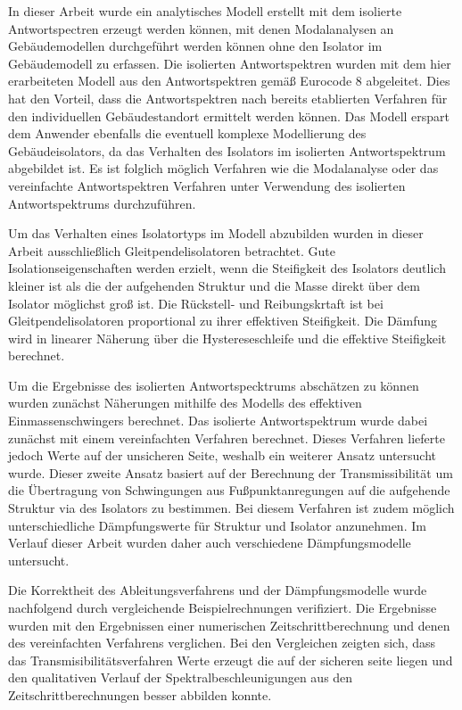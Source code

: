 
In dieser Arbeit wurde ein analytisches Modell erstellt mit dem isolierte Antwortspectren erzeugt werden können, mit denen Modalanalysen an Gebäudemodellen durchgeführt werden können ohne den Isolator im Gebäudemodell zu erfassen.
Die isolierten Antwortspektren wurden mit dem hier erarbeiteten Modell aus den Antwortspektren gemäß Eurocode 8 abgeleitet.
Dies hat den Vorteil, dass die Antwortspektren nach bereits etablierten Verfahren für den individuellen Gebäudestandort ermittelt werden können.
Das Modell erspart dem Anwender ebenfalls die eventuell komplexe Modellierung des Gebäudeisolators, da das Verhalten des Isolators im isolierten Antwortspektrum abgebildet ist.
Es ist folglich möglich Verfahren wie die Modalanalyse oder das vereinfachte Antwortspektren Verfahren unter Verwendung des isolierten Antwortspektrums durchzuführen.

Um das Verhalten eines Isolatortyps im Modell abzubilden wurden in dieser Arbeit ausschließlich Gleitpendelisolatoren betrachtet.
Gute Isolationseigenschaften werden erzielt, wenn die Steifigkeit des Isolators deutlich kleiner ist als die der aufgehenden Struktur und die Masse direkt über dem Isolator möglichst groß ist.
Die Rückstell- und Reibungskrtaft ist bei Gleitpendelisolatoren proportional zu ihrer effektiven Steifigkeit.
Die Dämfung wird in linearer Näherung über die Hystereseschleife und die effektive Steifigkeit berechnet.

Um die Ergebnisse des isolierten Antwortspecktrums abschätzen zu können wurden zunächst Näherungen mithilfe des Modells des effektiven Einmassenschwingers berechnet.
Das isolierte Antwortspektrum wurde dabei zunächst mit einem vereinfachten Verfahren berechnet. Dieses Verfahren lieferte jedoch Werte auf der unsicheren Seite, weshalb ein weiterer Ansatz untersucht wurde.
Dieser zweite Ansatz basiert auf der Berechnung der Transmissibilität um die Übertragung von Schwingungen aus Fußpunktanregungen auf die aufgehende Struktur via des Isolators zu bestimmen.
Bei diesem  Verfahren ist zudem möglich unterschiedliche Dämpfungswerte für Struktur und Isolator anzunehmen.
Im Verlauf dieser Arbeit wurden daher auch verschiedene Dämpfungsmodelle untersucht.

Die Korrektheit des Ableitungsverfahrens und der Dämpfungsmodelle wurde nachfolgend durch vergleichende Beispielrechnungen verifiziert.
Die Ergebnisse wurden mit den Ergebnissen einer numerischen Zeitschrittberechnung und denen des vereinfachten Verfahrens verglichen.
Bei den Vergleichen zeigten sich, dass das Transmisibilitätsverfahren Werte erzeugt die auf der sicheren seite liegen und den qualitativen Verlauf der Spektralbeschleunigungen aus den Zeitschrittberechnungen besser abbilden konnte.

